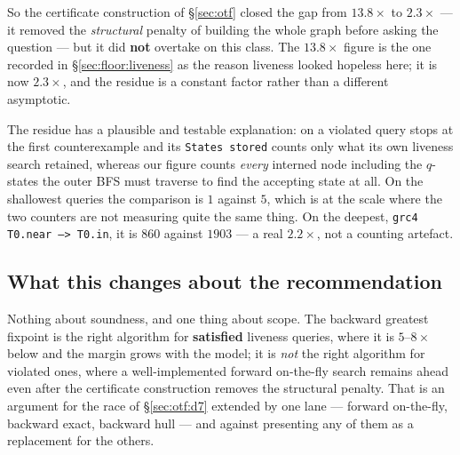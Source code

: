 So the certificate construction of \S\ref{sec:otf} closed the gap from $13.8\times$ to
$2.3\times$ --- it removed the \emph{structural} penalty of building the whole graph before
asking the question --- but it did \textbf{not} overtake \verifyta{} on this class. The
$13.8\times$ figure is the one recorded in \S\ref{sec:floor:liveness} as the reason liveness
looked hopeless here; it is now $2.3\times$, and the residue is a constant factor rather than a
different asymptotic. \measured{}

The residue has a plausible and testable explanation: on a violated query \verifyta{} stops at the
first counterexample and its \texttt{States stored} counts only what its own liveness search
retained, whereas our figure counts \emph{every} interned node including the $q$-states the outer
BFS must traverse to find the accepting state at all. On the shallowest queries the comparison is
$1$ against $5$, which is at the scale where the two counters are not measuring quite the same
thing. On the deepest, \texttt{grc4 T0.near --> T0.in}, it is $860$ against $1903$ --- a real
$2.2\times$, not a counting artefact. \openq{}

\subsection{What this changes about the recommendation}

Nothing about soundness, and one thing about scope. The backward greatest fixpoint is the right
algorithm for \textbf{satisfied} liveness queries, where it is $5$--$8\times$ below \verifyta{} and
the margin grows with the model; it is \emph{not} the right algorithm for violated ones, where a
well-implemented forward on-the-fly search remains ahead even after the certificate construction
removes the structural penalty. That is an argument for the race of \S\ref{sec:otf:d7} extended by
one lane --- forward on-the-fly, backward exact, backward hull --- and against presenting any of
them as a replacement for the others.
